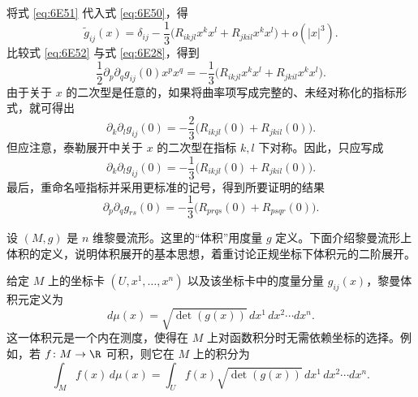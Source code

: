 \begin{itemize}
将式 \eqref{eq:6E51} 代入式 \eqref{eq:6E50}，得
\begin{equation*}
  \widetilde g_{ij}(x)=\delta_{ij}-\frac13
      \bigl(R_{ikjl}x^kx^l+R_{jkil}x^kx^l\bigr)+o(|x|^3).
  \tag{6E52}\label{eq:6E52}
\end{equation*}
比较式 \eqref{eq:6E52} 与式 \eqref{eq:6E28}，得到
\begin{equation*}
  \frac12\partial_p\partial_q g_{ij}(0)x^px^q
     =-\frac13\bigl(R_{ikjl}x^kx^l+R_{jkil}x^kx^l\bigr).
  \tag{6E53}\label{eq:6E53}
\end{equation*}
由于关于 $x$ 的二次型是任意的，如果将曲率项写成完整的、未经对称化的指标形式，就可得出
\begin{equation*}
  \partial_k\partial_l g_{ij}(0)
     =-\frac23\bigl(R_{ikjl}(0)+R_{jkil}(0)\bigr).
  \tag{6E54}\label{eq:6E54}
\end{equation*}
但应注意，泰勒展开中关于 $x$ 的二次型在指标 $k,l$ 下对称。因此，只应写成
\begin{equation*}
  \partial_k\partial_l g_{ij}(0)
     =-\frac13\bigl(R_{ikjl}(0)+R_{jkil}(0)\bigr).
  \tag{6E55}\label{eq:6E55}
\end{equation*}
最后，重命名哑指标并采用更标准的记号，得到所要证明的结果%
%
\begin{equation*}
  \partial_p\partial_q g_{rs}(0)
    =-\frac13\bigl(R_{prqs}(0)+R_{psqr}(0)\bigr).
  \tag{6E56}\label{eq:6E56}
\end{equation*}
\end{itemize}

设 $(M,g)$ 是 $n$ 维黎曼流形。这里的“体积”用度量 $g$ 定义。下面介绍黎曼流形上体积的定义，说明体积展开的基本思想，着重讨论正规坐标下体积元的二阶展开。

给定 $M$ 上的坐标卡 $(U,x^1,\dots,x^n)$ 以及该坐标卡中的度量分量 $g_{ij}(x)$，黎曼体积元定义为
\begin{equation*}
  d\mu(x)=\sqrt{\det(g(x))}\,dx^1\,dx^2\cdots dx^n.
  \tag{6E57}\label{eq:6E57}
\end{equation*}
这一体积元是一个内在测度，使得在 $M$ 上对函数积分时无需依赖坐标的选择。例如，若 $f\colon M\to\R$ 可积，则它在 $M$ 上的积分为%
%
\begin{equation*}
  \int_M f(x)\,d\mu(x)
  =\int_U f(x)\sqrt{\det(g(x))}\,dx^1\,dx^2\cdots dx^n.
  \tag{6E58}\label{eq:6E58}
\end{equation*}

